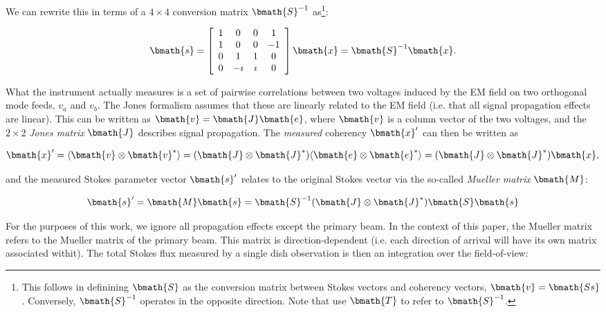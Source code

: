 \documentclass[fleqn,usenatbib]{mnras}
\begin{document}
We can rewrite this in terms of a $4\times4$ conversion matrix $\bmath{S}^{-1}$ as\footnote{This follows \cite{2011A&A...527A.106S} in definining $\bmath{S}$ as
the conversion matrix between Stokes vectors and coherency vectors, $\bmath{v}=\bmath{Ss}$. Conversely, $\bmath{S}^{-1}$ operates in the opposite direction. Note
that \cite{1996A&AS..117..137H} use $\bmath{T}$ to refer to $\bmath{S}^{-1}$.}:

\begin{equation}  \label{eq:mconversion}
\bmath{s} = \left[ \begin{array}{cccc}
                         1 & 0 & 0 & 1 \\
                         1 & 0 & 0 & -1 \\
                         0 & 1 & 1 & 0 \\
                         0 & -\imath & \imath & 0
                         \end{array} \right] \bmath{x} = \bmath{S}^{-1} \bmath{x}.
\end{equation}

What the instrument actually measures is a set of pairwise correlations between two voltages induced by the EM field on two orthogonal mode 
feeds, $v_a$ and $v_b$. The Jones formalism assumes that these are linearly related to the EM field (i.e. that all signal propagation effects are
linear). This can be written as $\bmath{v}=\bmath{J} \bmath{e}$, where $\bmath{v}$ is a column vector of the two voltages, and the $2\times 2$ \emph{Jones
matrix} $\bmath{J}$ describes signal propagation. The \emph{measured} coherency $\bmath{x}'$ can then be written as

\begin{equation} 
\bmath{x}' = \langle \bmath{v} \otimes \bmath{v}^* \rangle = (\bmath{J} \otimes \bmath{J}^* ) \langle \bmath{e} \otimes \bmath{e}^* \rangle = 
(\bmath{J} \otimes \bmath{J}^* ) \bmath{x},
\end{equation}

\noindent and the measured Stokes parameter vector $\bmath{s}'$ relates to the original Stokes vector via the so-called \emph{Mueller matrix} $\bmath{M}$:

\begin{equation}  
\bmath{s}' = \bmath{M} \bmath{s} = \bmath{S}^{-1} (\bmath{J} \otimes \bmath{J}^* ) \bmath{S} \bmath{s}
\end{equation}

For the purposes of this work, we ignore all propagation effects except the primary beam. In the context of this paper, the Mueller matrix refers to the Mueller matrix of the primary beam. This matrix is direction-dependent (i.e. each direction of arrival will have its own matrix associated withit). The total Stokes flux measured by a single dish observation is then an integration over the field-of-view:
\end{document}

